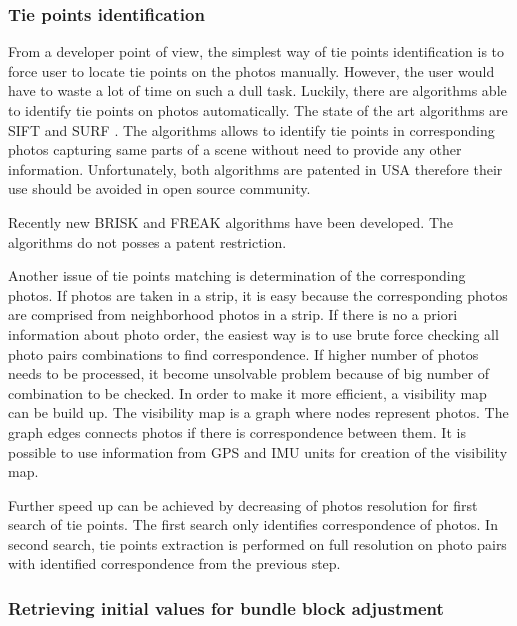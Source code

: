 \documentclass[a4paper,12pt]{article}
\begin{document}
\subsubsection{Tie points identification}

From a developer point of view, the simplest way of tie points identification is to force user to locate tie points on 
the photos manually. However, the  user would have to waste a lot of time on such a 
dull task. Luckily, there are algorithms able to identify tie points on photos
automatically. The state of the art algorithms are SIFT \cite{wiki:SIFT} and SURF \cite{wiki:SURF}.
The algorithms allows to identify tie points in corresponding photos capturing same parts of a scene without need to provide any other information.
Unfortunately, both algorithms are patented in USA therefore their use should be avoided in open source community.

Recently new BRISK \cite{leutenegger2011brisk} and FREAK \cite{alahi2012freak} algorithms
have been developed. The algorithms do not posses a patent restriction. 

Another issue of tie points matching is determination of the corresponding photos. 
If photos are taken in a strip, it is easy because the corresponding photos are comprised from neighborhood photos 
in a strip.
If there is no a priori information about photo order, the easiest way is to use brute force 
checking all photo pairs combinations to find correspondence.
If higher number of photos needs to be processed, it become unsolvable problem 
because of big number of combination to be checked. In order to make 
it more efficient, a visibility map \cite{barazzetti2010extraction} can be build up. 
The visibility map is a graph where nodes represent photos. The graph edges connects photos if there is
correspondence between them.  It is possible to use information from GPS and IMU units for creation of the visibility map.

Further speed up can be achieved by decreasing of photos resolution 
for first search of tie points. The first search only identifies correspondence of photos.
In second search, tie points extraction is performed on full resolution 
on photo pairs with identified correspondence from the previous step.

\subsubsection{Retrieving initial values for bundle block adjustment}
\end{document}
